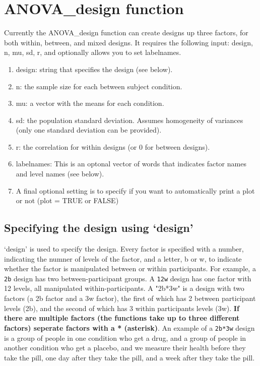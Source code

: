 \documentclass[]{book}
\providecommand{\tightlist}{%
  \setlength{\itemsep}{0pt}\setlength{\parskip}{0pt}}
\begin{document}
\hypertarget{anova_design-function}{%
\section{ANOVA\_design function}\label{anova_design-function}}

Currently the ANOVA\_design function can create designs up three factors, for both within, between, and mixed designs. It requires the following input: design, n, mu, sd, r, and optionally allows you to set labelnames.

\begin{enumerate}
\def\labelenumi{\arabic{enumi}.}
\tightlist
\item
  design: string that specifies the design (see below).
\item
  n: the sample size for each between subject condition.
\item
  mu: a vector with the means for each condition.
\item
  sd: the population standard deviation. Assumes homogeneity of variances (only one standard deviation can be provided).
\item
  r: the correlation for within designs (or 0 for between designs).
\item
  labelnames: This is an optonal vector of words that indicates factor names and level names (see below).
\item
  A final optional setting is to specify if you want to automatically print a plot or not (plot = TRUE or FALSE)
\end{enumerate}

\hypertarget{specifying-the-design-using-design}{%
\subsection{Specifying the design using `design'}\label{specifying-the-design-using-design}}

`design' is used to specify the design.
Every factor is specified with a number, indicating the numner of levels of the factor, and a letter, b or w, to indicate whether the factor is manipulated between or within participants.
For example, a \texttt{2b} design has two between-participant groups.
A \texttt{12w} design has one factor with 12 levels, all manipulated within-participants.
A "2b*3w" is a design with two factors (a 2b factor and a 3w factor), the first of which has 2 between participant levels (2b), and the second of which has 3 within participants levels (3w).
\textbf{If there are multiple factors (the functions take up to three different factors) seperate factors with a * (asterisk)}.
An example of a \texttt{2b*3w} design is a group of people in one condition who get a drug, and a group of people in another condition who get a placebo, and we measure their health before they take the pill, one day after they take the pill, and a week after they take the pill.
\end{document}
